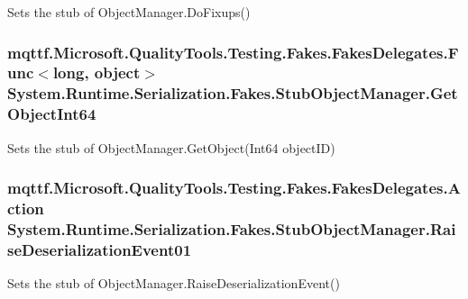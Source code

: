 Sets the stub of Object\-Manager.\-Do\-Fixups()

\hypertarget{class_system_1_1_runtime_1_1_serialization_1_1_fakes_1_1_stub_object_manager_a046a335f86d00d01ff31346a55a0ac49}{
\subsubsection[{Get\-Object\-Int64}]{\setlength{\rightskip}{0pt plus 5cm}mqttf.\-Microsoft.\-Quality\-Tools.\-Testing.\-Fakes.\-Fakes\-Delegates.\-Func$<$long, object$>$ System.\-Runtime.\-Serialization.\-Fakes.\-Stub\-Object\-Manager.\-Get\-Object\-Int64}}\label{class_system_1_1_runtime_1_1_serialization_1_1_fakes_1_1_stub_object_manager_a046a335f86d00d01ff31346a55a0ac49}


Sets the stub of Object\-Manager.\-Get\-Object(\-Int64 object\-I\-D)

\hypertarget{class_system_1_1_runtime_1_1_serialization_1_1_fakes_1_1_stub_object_manager_ae65e1dbc2f7fa3e8be3589edf8d73da9}{
\subsubsection[{Raise\-Deserialization\-Event01}]{\setlength{\rightskip}{0pt plus 5cm}mqttf.\-Microsoft.\-Quality\-Tools.\-Testing.\-Fakes.\-Fakes\-Delegates.\-Action System.\-Runtime.\-Serialization.\-Fakes.\-Stub\-Object\-Manager.\-Raise\-Deserialization\-Event01}}\label{class_system_1_1_runtime_1_1_serialization_1_1_fakes_1_1_stub_object_manager_ae65e1dbc2f7fa3e8be3589edf8d73da9}


Sets the stub of Object\-Manager.\-Raise\-Deserialization\-Event()

